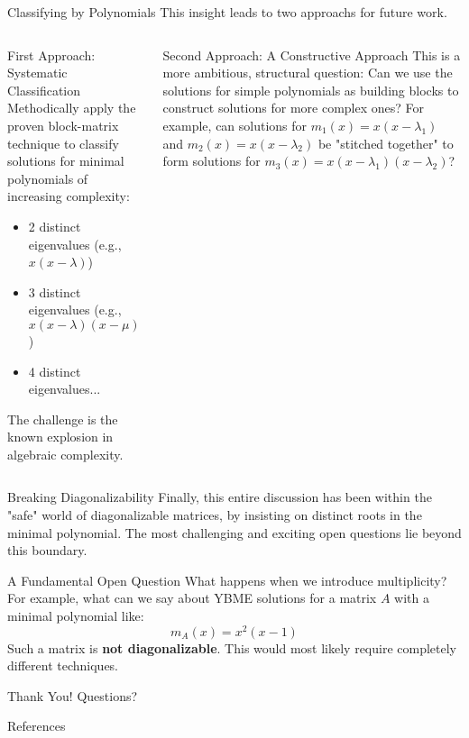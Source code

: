 \documentclass{beamer}
\begin{document}
\begin{frame}{Classifying by Polynomials}
  This insight leads to two approachs for future work.
  \begin{columns}[T]
    \begin{column}{.5\textwidth}
      \begin{block}{First Approach: Systematic Classification}
        Methodically apply the proven block-matrix technique to classify solutions for minimal polynomials of increasing complexity:
        \begin{itemize}
            \item 2 distinct eigenvalues (e.g., $x(x-\lambda)$)
            \item 3 distinct eigenvalues (e.g., $x(x-\lambda)(x-\mu)$)
            \item 4 distinct eigenvalues...
        \end{itemize}
        The challenge is the known explosion in algebraic complexity.
      \end{block}
    \end{column}
    \begin{column}{.5\textwidth}
      \begin{alertblock}{Second Approach: A Constructive Approach}
        This is a more ambitious, structural question:
        \vfill
        Can we use the solutions for simple polynomials as building blocks to construct solutions for more complex ones?
        \vfill
        For example, can solutions for $m_1(x)=x(x-\lambda_1)$ and $m_2(x)=x(x-\lambda_2)$ be "stitched together" to form solutions for $m_3(x)=x(x-\lambda_1)(x-\lambda_2)$?
      \end{alertblock}
    \end{column}
  \end{columns}
\end{frame}

\begin{frame}{Breaking Diagonalizability}
  Finally, this entire discussion has been within the "safe" world of diagonalizable matrices, by insisting on distinct roots in the minimal polynomial.
  \vfill
  The most challenging and exciting open questions lie beyond this boundary.
  \begin{block}{A Fundamental Open Question}
  What happens when we introduce multiplicity?
  \vfill
  For example, what can we say about YBME solutions for a matrix $A$ with a minimal polynomial like:
  \[ m_A(x) = x^2(x-1) \]
  Such a matrix is \textbf{not diagonalizable}. This would most likely require completely different techniques.
  \end{block}
\end{frame}


\begin{frame}
  \begin{center}
    \Huge Thank You!
    \vfill
    Questions?
  \end{center}
\end{frame}

\begin{frame}[allowframebreaks]{References}
  
\end{frame}
\end{document}
